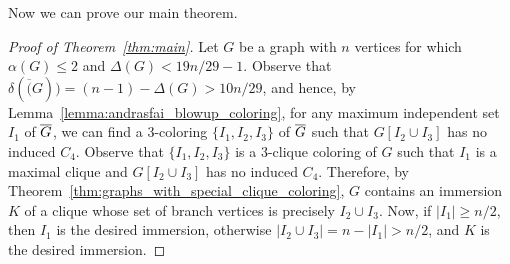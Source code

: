 \documentclass[a4paper,12pt]{article}
\begin{document}
\begin{figure}[ht]
    \centering
        \centering
    \caption{}
    \label{fig:induced-C4}
\end{figure}

Now we can prove our main theorem.

\begin{proof}[Proof of Theorem~\ref{thm:main}]
	Let \(G\) be a graph with \(n\) vertices for which \(\alpha(G) \leq 2\)
	and \(\Delta(G) < 19n/29 - 1\).
	Observe that \(\delta(\overline(G)) = (n-1) - \Delta(G) > 10n/29\),
	and hence, by Lemma~\ref{lemma:andrasfai_blowup_coloring},
	for any maximum independent set \(I_1\) of \(\overline{G}\),
	we can find a \(3\)-coloring \(\{I_1,I_2,I_3\}\) of \(\overline{G}\)
	such that \(G[I_2\cup I_3]\) has no induced \(C_4\).
	Observe that \(\{I_1,I_2,I_3\}\) 
	is a \(3\)-clique coloring of \(G\)
	such that \(I_1\) is a maximal clique and \(G[I_2\cup I_3]\) has no induced \(C_4\).
	Therefore, by Theorem~\ref{thm:graphs_with_special_clique_coloring},
	\(G\) contains an immersion \(K\) of a clique whose set of branch vertices is precisely \(I_2\cup I_3\).
	Now, if \(|I_1| \geq n/2\), then \(I_1\) is the desired immersion,
	otherwise \(|I_2\cup I_3| = n - |I_1| > n/2\),
	and \(K\) is the desired immersion.
\end{proof}
\end{document}
